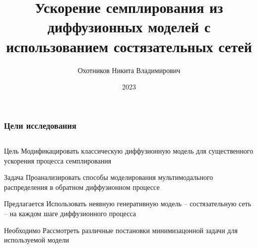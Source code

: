 \documentclass[8pt]{beamer}
\title[]{Ускорение семплирования из диффузионных моделей с использованием состязательных сетей}
\author{Охотников Никита Владимирович}
\institute{МФТИ}
\date{2023}
\begin{document}
\begin{frame}
  \titlepage
\end{frame}


\begin{frame}
	\frametitle{Цели исследования}
	
	\begin{columns}
		\begin{column}{0.9\textwidth}
	
			\begin{block}{Цель}
				\smallskip
			Модификацировать классическую диффузионную модель для существенного ускорения процесса семплирования
			\end{block}	
		
			\bigskip
		
			\begin{block}{Задача}
					\smallskip
				Проанализировать способы моделирования мультимодального распределения в обратном диффузионном процессе
			\end{block}	
		
			\bigskip
			
			\begin{block}{Предлагается}
				\smallskip
				Использовать неявную генеративную модель -- состязательную сеть -- на каждом шаге диффузионного процесса
			\end{block}	
		
			\bigskip
		
			\begin{block}{Необходимо}
				\smallskip
				Рассмотреть различные постановки минимизацонной задачи для используемой модели
			\end{block}	

	     \end{column}
	\end{columns}


\end{frame}
\end{document}
